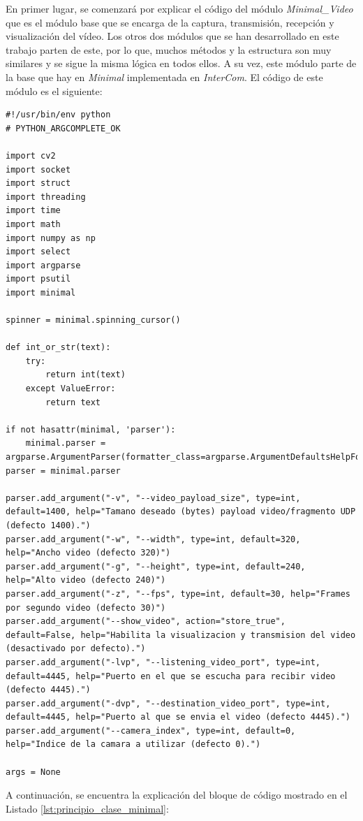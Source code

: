 En primer lugar, se comenzará por explicar el código del módulo \textit{Minimal\_Video} que es el módulo base que se encarga de la captura, transmisión, recepción y visualización del vídeo. Los otros dos módulos que se han desarrollado en este trabajo parten de este, por lo que, muchos métodos y la estructura son muy similares y se sigue la misma lógica en todos ellos. A su vez, este módulo parte de la base que hay en \textit{Minimal} implementada en \textit{InterCom}. El código de este módulo es el siguiente:
\begin{lstlisting}[style=pythonstyle, caption={Comienzo del módulo \textit{Minimal\_Video} y sus parámetros.}, label={lst:principio_clase_minimal}]
#!/usr/bin/env python
# PYTHON_ARGCOMPLETE_OK

import cv2
import socket
import struct
import threading
import time
import math
import numpy as np
import select
import argparse
import psutil
import minimal

spinner = minimal.spinning_cursor()

def int_or_str(text):
    try:
        return int(text)
    except ValueError:
        return text

if not hasattr(minimal, 'parser'):
    minimal.parser = argparse.ArgumentParser(formatter_class=argparse.ArgumentDefaultsHelpFormatter)
parser = minimal.parser

parser.add_argument("-v", "--video_payload_size", type=int, default=1400, help="Tamano deseado (bytes) payload video/fragmento UDP (defecto 1400).")
parser.add_argument("-w", "--width", type=int, default=320, help="Ancho video (defecto 320)")
parser.add_argument("-g", "--height", type=int, default=240, help="Alto video (defecto 240)")
parser.add_argument("-z", "--fps", type=int, default=30, help="Frames por segundo video (defecto 30)")
parser.add_argument("--show_video", action="store_true", default=False, help="Habilita la visualizacion y transmision del video (desactivado por defecto).")
parser.add_argument("-lvp", "--listening_video_port", type=int, default=4445, help="Puerto en el que se escucha para recibir video (defecto 4445).")
parser.add_argument("-dvp", "--destination_video_port", type=int, default=4445, help="Puerto al que se envia el video (defecto 4445).")
parser.add_argument("--camera_index", type=int, default=0, help="Indice de la camara a utilizar (defecto 0).")

args = None
\end{lstlisting}

A continuación, se encuentra la explicación del bloque de código mostrado en el Listado \ref{lst:principio_clase_minimal}:


